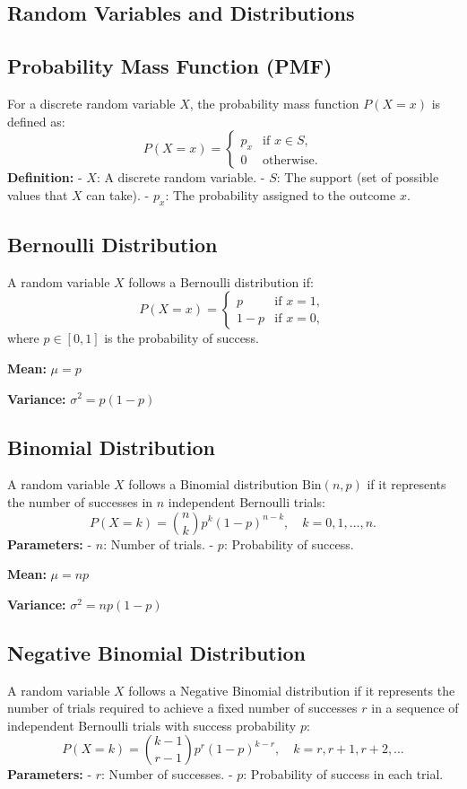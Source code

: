 \documentclass{article}
\begin{document}
\begin{multicols}{2}
\section*{Random Variables and Distributions}

\subsection*{Probability Mass Function (PMF)}
For a discrete random variable \( X \), the probability mass function \( P(X = x) \) is defined as:
\[
P(X = x) = \begin{cases}
  p_x & \text{if } x \in S, \\
  0 & \text{otherwise.}
\end{cases}
\]
\textbf{Definition:}
- \( X \): A discrete random variable.
- \( S \): The support (set of possible values that \( X \) can take).
- \( p_x \): The probability assigned to the outcome \( x \).

\subsection*{Bernoulli Distribution}
A random variable \( X \) follows a Bernoulli distribution if:
\[
P(X = x) = \begin{cases}
  p & \text{if } x = 1, \\
  1-p & \text{if } x = 0,
\end{cases}
\]
where \( p \in [0, 1] \) is the probability of success.

\textbf{Mean:} \( \mu = p \)

\textbf{Variance:} \( \sigma^2 = p(1-p) \)

\subsection*{Binomial Distribution}
A random variable \( X \) follows a Binomial distribution \( \text{Bin}(n, p) \) if it represents the number of successes in \( n \) independent Bernoulli trials:
\[
P(X = k) = \binom{n}{k} p^k (1-p)^{n-k}, \quad k = 0, 1, \dots, n.
\]
\textbf{Parameters:}
- \( n \): Number of trials.
- \( p \): Probability of success.

\textbf{Mean:} \( \mu = np \)

\textbf{Variance:} \( \sigma^2 = np(1-p) \)

\subsection*{Negative Binomial Distribution}
A random variable \( X \) follows a Negative Binomial distribution if it represents the number of trials required to achieve a fixed number of successes \( r \) in a sequence of independent Bernoulli trials with success probability \( p \):
\[
P(X = k) = \binom{k-1}{r-1} p^r (1-p)^{k-r}, \quad k = r, r+1, r+2, \dots
\]
\textbf{Parameters:}
- \( r \): Number of successes.
- \( p \): Probability of success in each trial.


\end{multicols}
\end{document}
